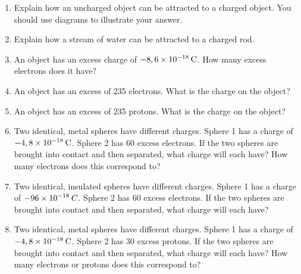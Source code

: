 \begin{enumerate}[noitemsep, label=\textbf{\arabic*}. ]
\label{m38781*uid43}\item Explain how an uncharged object can be attracted to a charged object. You should use diagrams to illustrate your answer.\newline
            
\label{m38781*uid44}\item Explain how a stream of water can be attracted to a charged rod.\newline
            
\item An object has an excess charge of 
\begin{math}-8,6\ensuremath{\times}{10}^{-18}\phantom{\rule{2pt}{0ex}}\mathrm{C}\end{math}. How many excess electrons does it have?\newline
            \item An object has an excess of 235 electrons. What is the charge on the object?\newline
            \item An object has an excess of 235 protons. What is the charge on the object?\newline
            \item Two identical, metal spheres have different charges. Sphere 1 has a charge of 
\begin{math}-4,8\ensuremath{\times}{10}^{-18}\phantom{\rule{2pt}{0ex}}\mathrm{C}\end{math}. Sphere 2 has 60 excess electrons. If the two spheres are brought into contact and then separated, what charge will each have? How many electrons does this correspond to?\newline
            \item Two identical, insulated spheres have different charges. Sphere 1 has a charge of 
\begin{math}-96\ensuremath{\times}{10}^{-18}\phantom{\rule{2pt}{0ex}}C\end{math}. Sphere 2 has 60 excess electrons. If the two spheres are brought into contact and then separated, what charge will each have? \newline
            \item Two identical, metal spheres have different charges. Sphere 1 has a charge of 
\begin{math}-4,8\ensuremath{\times}{10}^{-18}\phantom{\rule{2pt}{0ex}}\mathrm{C}\end{math}. Sphere 2 has 30 excess protons. If the two spheres are brought into contact and then separated, what charge will each have? How many electrons or protons does this correspond to?\newline
            \end{enumerate}
        
